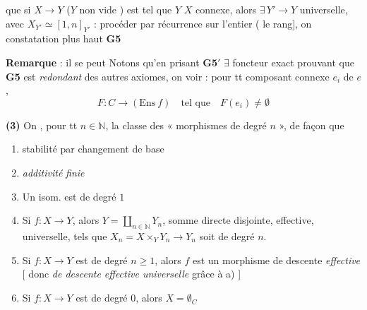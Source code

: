 \documentclass[11pt,a4paper]{article}
\begin{document}
\marginal{[\textbf{G3}]}



 \ill{} que si $X \longrightarrow Y$ ($Y$
 \ill{} non vide \ill{}) est tel que $Y$ \ill{} $X$ connexe, alors
$\exists\, Y' \longrightarrow Y$ \ill{} universelle, avec
$X_{Y'} \simeq [1, n]_{Y'}$ : procéder par récurrence sur l'entier
 (\ill{} le rang], on \ill{} constatation
plus haut \ill{} \textbf{G5} \ill{}

\textbf{Remarque} : il se peut \ill{} Notons qu'en prisant \ill{}
\textbf{G5}$'$ \struck{\ill{}} \ill{} $\exists$ foncteur exact \ill{}
prouvant que \textbf{G5} est \emph{redondant} \ill{} des autres axiomes, on
\ill{} voir : pour tt composant connexe $e_i$ de $e$, \ill{}
\[
  F : C \longrightarrow (\mathrm{Ens}\ f) \quad \text{tel que}
  \quad F(e_i) \neq \emptyset
\]



\textbf{(3)} On , pour tt $n \in \mathbb{N}$, la
classe des « morphismes de degré $n$ », de façon que

\begin{enumerate}
\item[a)] stabilité par changement de base
\item[b)] \emph{additivité} \emph{finie}
\item[c)] Un isom. est de degré $1$
\item[\struck{d)} f)] Si $f : X \longrightarrow Y$, alors
$Y = \displaystyle\coprod_{n \in \mathbb{N}} Y_n$, somme directe disjointe,
effective, universelle, tels que
$X_n = X \times_Y Y_n \longrightarrow Y_n$ soit de degré $n$.
\item[d)] Si $f : X \longrightarrow Y$ est de degré $n \geq 1$, alors $f$
est un morphisme de descente \emph{effective}
[ donc \emph{de descente effective universelle} grâce à a) ]
\item[e)] Si $f : X \longrightarrow Y$ est de degré $0$, alors
$X = \emptyset_C$
\end{enumerate}
\end{document}
